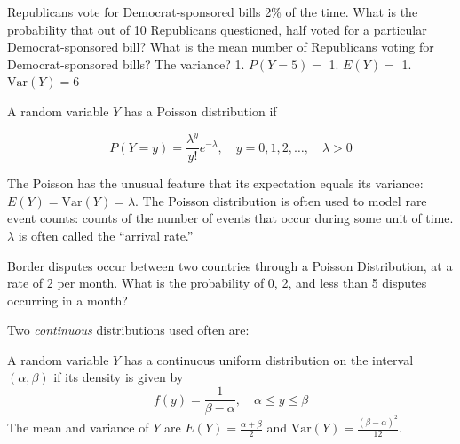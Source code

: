 \documentclass[
]{book}
\begin{document}
\begin{example}
\protect\hypertarget{exm:unnamed-chunk-88}{}\label{exm:unnamed-chunk-88}Republicans vote for Democrat-sponsored bills 2\% of the time. What is the probability that out of 10 Republicans questioned, half voted for a particular Democrat-sponsored bill? What is the mean number of Republicans voting for Democrat-sponsored bills? The variance?
1. \(P(Y=5)=\)
1. \(E(Y)=\)
1. \(\text{Var}(Y)=6\)
\end{example}

\begin{definition}
\protect\hypertarget{def:unnamed-chunk-89}{}\label{def:unnamed-chunk-89}A random variable \(Y\) has a Poisson distribution if

\[P(Y = y)=\frac{\lambda^y}{y!}e^{-\lambda}, \quad y=0,1,2,\ldots, \quad \lambda>0\]

The Poisson has the unusual feature that its expectation equals its variance: \(E(Y)=\text{Var}(Y)=\lambda\). The Poisson distribution is often used to model rare event counts: counts of the number of events that occur during some unit of time. \(\lambda\) is often called the ``arrival rate.''
\end{definition}

\begin{example}
\protect\hypertarget{exm:unnamed-chunk-90}{}\label{exm:unnamed-chunk-90}Border disputes occur between two countries through a Poisson Distribution, at a rate of 2 per month. What is the probability of 0, 2, and less than 5 disputes occurring in a month?
\end{example}

Two \emph{continuous} distributions used often are:

\begin{definition}
\protect\hypertarget{def:unnamed-chunk-91}{}\label{def:unnamed-chunk-91}A random variable \(Y\) has a continuous uniform distribution on the interval \((\alpha,\beta)\) if its density is given by \[f(y)=\frac{1}{\beta-\alpha}, \quad \alpha\le y\le \beta\] The mean and variance of \(Y\) are \(E(Y)=\frac{\alpha+\beta}{2}\) and \(\text{Var}(Y)=\frac{(\beta-\alpha)^2}{12}\).
\end{definition}
\end{document}
